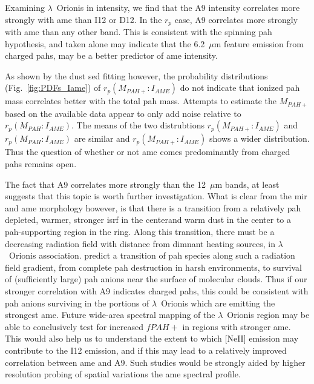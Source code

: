           Examining $\lambda$~Orionis in intensity, we find that the A9 intensity correlates more strongly with \acrshort{ame} than I12 or D12. In the $r_{p}$ case, A9 correlates more strongly with \acrshort{ame} than any other band. This is consistent with the spinning \acrshort{pah} hypothesis, and taken alone may indicate that the 6.2~$\mu$m feature emission from charged \acrshort{pah}s, may be a better predictor of \acrshort{ame} intensity.

          As shown by the dust \acrshort{sed} fitting however, the probability distributions (Fig.~\ref{fig:PDFs_Iame}) of $r_{p}(M_{PAH+}:I_{AME})$ do not indicate that ionized \acrshort{pah} mass correlates better with the total \acrshort{pah} mass. Attempts to estimate the $M_{PAH+}$ based on the available data appear to only add noise relative to $r_{p}(M_{PAH}:I_{AME})$. The means of the two distrubtions $r_{p}(M_{PAH+}:I_{AME})$  and $r_{p}(M_{PAH}:I_{AME})$ are similar and $r_{p}(M_{PAH+}:I_{AME})$ shows a wider distribution. Thus the question of whether or not \acrshort{ame} comes predominantly from charged \acrshort{pah}s remains open.

          The fact that A9 correlates more strongly than the 12~$\mu$m bands, at least suggests that this topic is worth further investigation. What is clear from the \acrshort{mir} and \acrshort{ame} morphology however, is that there is a transition from a relatively \acrshort{pah} depleted, warmer, stronger \acrshort{isrf} in the centerand warm dust in the center to a \acrshort{pah}-supporting region in the ring. Along this transition, there must be a decreasing radiation field with distance from dimnant heating sources, in $\lambda$~Orionis association. \cite{andrews16} predict a transition of \acrshort{pah} species along such a radiation field gradient, from complete \acrshort{pah} destruction in harsh environments, to survival of (sufficiently large) \acrshort{pah} anions near the surface of molecular clouds. Thus if our stronger correlation with A9 indicates charged \acrshort{pah}s, this could be consistent with \acrshort{pah} anions surviving in the portions of $\lambda$~Orionis which are emitting the strongest \acrshort{ame}. Future wide-area spectral mapping of the ${\lambda}$~Orionis region may be able to conclusively test for increased $fPAH+$ in regions with stronger \acrshort{ame}. This would also help us to understand the extent to which [NeII] emission may contribute to the I12 emission, and if this may lead to a relatively improved correlation between \acrshort{ame} and A9. Such studies would be strongly aided by higher resolution probing of spatial variations the \acrshort{ame} spectral profile.
